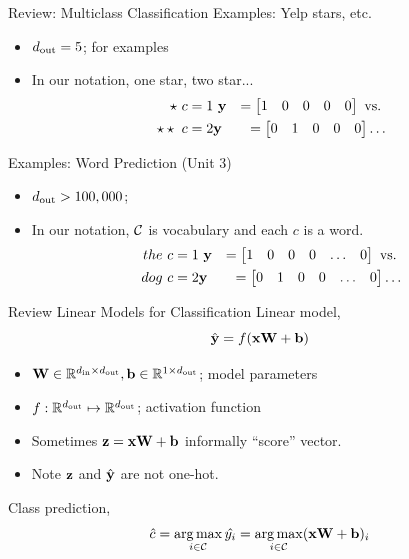 \documentclass{beamer}
\begin{document}
\begin{frame}{Review: Multiclass Classification}
  Examples: Yelp stars, etc.
  \begin{itemize}
  \item ${d_{\mathrm{out}}} = 5$; for examples
  \item In our notation, one star, two star...
    \begin{eqnarray*}
      \star \ c = 1 & \  \mathbf{y} &= \begin{bmatrix} 1 & 0 & 0 & 0 & 0  \end{bmatrix}  \mathrm {\ vs. \ } \\
    \star \star \ c = 2 & \mathbf{y} &=    \begin{bmatrix} 0 & 1 & 0 & 0 & 0 \end{bmatrix} \ldots
   \end{eqnarray*}
  \end{itemize}
  Examples: Word Prediction (Unit 3)
  \begin{itemize}
  \item ${d_{\mathrm{out}}} > 100,000$;
  \item In our notation, $\mathcal{C}$ is vocabulary and each $c$ is a word.
    \begin{eqnarray*}
      the \ c = 1 & \  \mathbf{y} &= \begin{bmatrix} 1 & 0 & 0 & 0 & \ldots & 0  \end{bmatrix}  \mathrm {\ vs. \ } \\
      dog \ c = 2 & \mathbf{y} &=    \begin{bmatrix} 0 & 1 & 0 & 0 & \ldots & 0 \end{bmatrix} \ldots
   \end{eqnarray*}
  \end{itemize}
\end{frame}


\begin{frame}{Review Linear Models for Classification}
  Linear model,
  \[\hat{\mathbf{y}} = f(\mathbf{x} \mathbf{W} + \mathbf{b})\]
  \begin{itemize}
  \item $\mathbf{W} \in \mathbb{R}^{{d_{\mathrm{in}}} \times {d_{\mathrm{out}}}}, \mathbf{b} \in \mathbb{R}^{1 \times {d_{\mathrm{out}}}}$; model parameters
  \item $f: \mathbb{R}^{{d_{\mathrm{out}}}} \mapsto \mathbb{R}^{{d_{\mathrm{out}}}}$; activation function
  \item Sometimes $\mathbf{z} = \mathbf{x} \mathbf{W} + \mathbf{b}$ informally ``score'' vector.
  \item Note $\mathbf{z}$ and $\hat{\mathbf{y}}$ are not one-hot.
  \end{itemize}

  \air

  Class prediction,
  \[ \hat{c} = \argmax_{i \in \mcC} \hat{y_i}  = \argmax_{i \in \mcC} (\boldx \boldW + \boldb)_i    \]
\end{frame}
\end{document}
